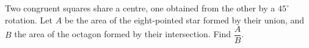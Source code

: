 Two congruent squares share a centre, one obtained from the other by a $45^\circ$ rotation. Let $A$ be the area of the eight-pointed star formed by their union, and $B$ the area of the octagon formed by their intersection. Find $\dfrac AB$.
